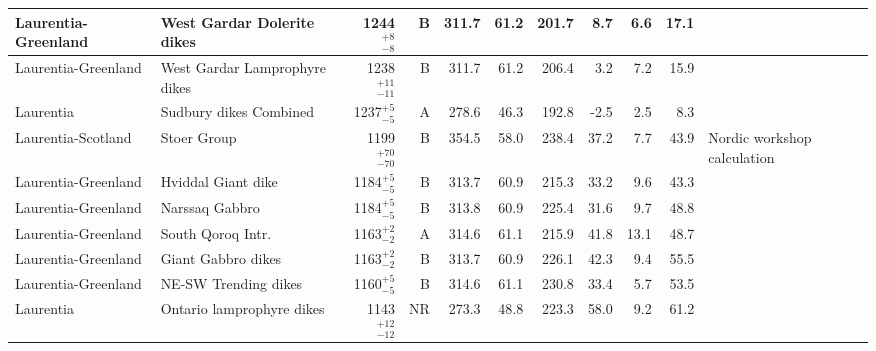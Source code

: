 \documentclass[twocolumn, switch]{article} %
\begin{document}
{\begin{landscape}
\begin{ThreePartTable}
\begin{longtable}{p{1.4 in}p{1.2 in}rrrrrrrrp{1.2 in}}
           Laurentia-Greenland &                         West Gardar Dolerite dikes &     1244$^{+8}_{-8}$ &      B &     311.7 &      61.2 & 201.7 &   8.7 &       6.6 &        17.1 &                                  \cite{Piper1977b} \\ \hline
           Laurentia-Greenland &                      West Gardar Lamprophyre dikes &   1238$^{+11}_{-11}$ &      B &     311.7 &      61.2 & 206.4 &   3.2 &       7.2 &        15.9 &                                  \cite{Piper1977b} \\ \hline
                     Laurentia &                             Sudbury dikes Combined &     1237$^{+5}_{-5}$ &      A &     278.6 &      46.3 & 192.8 &  -2.5 &       2.5 &         8.3 &                                 \cite{Palmer1977a} \\ \hline
            Laurentia-Scotland &                                        Stoer Group &   1199$^{+70}_{-70}$ &      B &     354.5 &      58.0 & 238.4 &  37.2 &       7.7 &        43.9 &                        Nordic workshop calculation \\ \hline
           Laurentia-Greenland &                                 Hviddal Giant dike &     1184$^{+5}_{-5}$ &      B &     313.7 &      60.9 & 215.3 &  33.2 &       9.6 &        43.3 &                                  \cite{Piper1977a} \\ \hline
           Laurentia-Greenland &                                     Narssaq Gabbro &     1184$^{+5}_{-5}$ &      B &     313.8 &      60.9 & 225.4 &  31.6 &       9.7 &        48.8 &                                  \cite{Piper1977a} \\ \hline
           Laurentia-Greenland &                                  South Qoroq Intr. &     1163$^{+2}_{-2}$ &      A &     314.6 &      61.1 & 215.9 &  41.8 &      13.1 &        48.7 &                                  \cite{Piper1992a} \\ \hline
           Laurentia-Greenland &                                 Giant Gabbro dikes &     1163$^{+2}_{-2}$ &      B &     313.7 &      60.9 & 226.1 &  42.3 &       9.4 &        55.5 &                                  \cite{Piper1977a} \\ \hline
           Laurentia-Greenland &                               NE-SW Trending dikes &     1160$^{+5}_{-5}$ &      B &     314.6 &      61.1 & 230.8 &  33.4 &       5.7 &        53.5 &                                  \cite{Piper1992a} \\ \hline
                     Laurentia &                          Ontario lamprophyre dikes &   1143$^{+12}_{-12}$ &     NR &     273.3 &      48.8 & 223.3 &  58.0 &       9.2 &        61.2 &                                 \cite{Piispa2018a} \\ \hline

\end{longtable}
\end{ThreePartTable}
\end{landscape}}
\end{document}
